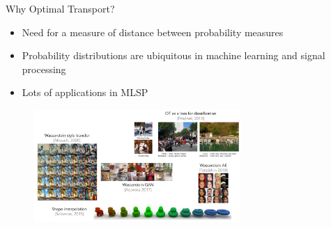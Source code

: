 \documentclass[pdf,aspectratio=169,10pt]{beamer}
\begin{document}
\begin{frame}{Why Optimal Transport?}
    \begin{itemize}
        \item Need for a  measure of distance between probability measures
        \item Probability distributions are ubiquitous in machine learning and signal processing
        \item Lots of applications in MLSP
    \end{itemize}
    \begin{figure}
        \includegraphics[width=0.7\textwidth]{../img/applications}  
    \end{figure}    
\end{frame}
\end{document}
